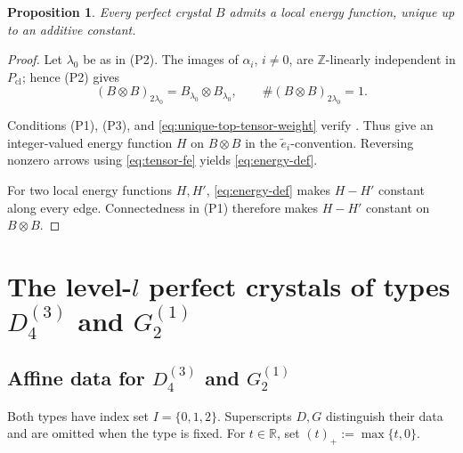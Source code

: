 \documentclass[11pt,reqno]{amsart}
\numberwithin{table}{section}
\numberwithin{equation}{section}
\theoremstyle{plain}
\newtheorem{proposition}[theorem]{Proposition}
\theoremstyle{definition}
\begin{document}
\begin{proposition}\label{prop:perfect-energy-existence}
	Every perfect crystal \(B\) admits a local energy function,
	unique up to an additive constant.
\end{proposition}

\begin{proof}
	Let \(\lambda_0\) be as in \textup{(P2)}.
	The images of \(\alpha_i\), \(i\ne0\), are
	\(\mathbb Z\)-linearly independent in \(P_{\mathrm{cl}}\);
	hence \textup{(P2)} gives
	\begin{equation}\label{eq:unique-top-tensor-weight}
		(B\otimes B)_{2\lambda_0}
		=
		B_{\lambda_0}\otimes B_{\lambda_0},
		\qquad
		\#(B\otimes B)_{2\lambda_0}=1.
	\end{equation}
	
	Conditions \textup{(P1)}, \textup{(P3)}, and
	\eqref{eq:unique-top-tensor-weight} verify
	\cite[conditions~(3.4.2)--(3.4.3) and~(4.2.3)--(4.2.4)]{KMN1}.
	Thus \cite[Propositions~4.3.1 and~4.2.2]{KMN1} give an
	integer-valued energy function \(H\) on \(B\otimes B\)
	in the \(\widetilde e_i\)-convention.
	Reversing nonzero arrows using \eqref{eq:tensor-fe}
	yields \eqref{eq:energy-def}.
	
	For two local energy functions \(H,H'\),
	\eqref{eq:energy-def} makes \(H-H'\) constant along every edge.
	Connectedness in \textup{(P1)} therefore makes \(H-H'\)
	constant on \(B\otimes B\).
\end{proof}

\section{\texorpdfstring{The level-$l$ perfect crystals of types
		$D_4^{(3)}$ and $G_2^{(1)}$}
	{The level-l perfect crystals of types D4(3) and G2(1)}}
\label{sec:perfect-crystal-models}

\subsection{\texorpdfstring{Affine data for $D_4^{(3)}$ and $G_2^{(1)}$}
	{Affine data for D4(3) and G2(1)}}

Both types have index set \(I=\{0,1,2\}\).
Superscripts \(D,G\) distinguish their data and are omitted when
the type is fixed.
For \(t\in\mathbb R\), set \((t)_+:=\max\{t,0\}\).
\end{document}

